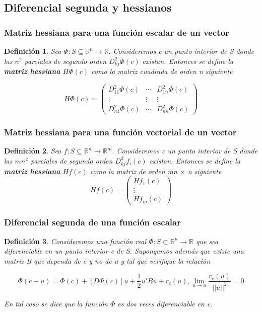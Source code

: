 \documentclass{article}
\theoremstyle{theorem-style}  %
\theoremstyle{definition-style}
\newtheorem{definition}{Definición}[section]
\theoremstyle{example-style}
\theoremstyle{exercise-style}
\begin{document}
	\subsection{Diferencial segunda y hessianos}
	
	\subsubsection{Matriz hessiana para una función escalar de un vector}
	
	\begin{definition}
		Sea $\Phi: S \subseteq \mathbb{R}^n \rightarrow \mathbb{R}.$ Consideremos c un punto interior de S donde las $n^2$ parciales de segundo orden $D^2_{kj}\Phi(c)$ existan. Entonces se define la \textbf{matriz hessiana} $H\Phi(c)$ como la matriz cuadrada de orden n siguiente
		
		$$H\Phi(c) = \left( \begin{matrix}
		D^2_{11}\Phi(c) & \cdots & D^2_{1n}\Phi(c)\\
		\vdots & \vdots & \vdots \\
		D^2_{n1}\Phi(c) & \cdots & D^2_{nn}\Phi(c) \end{matrix} \right)$$
	\end{definition}
	
	\subsubsection{Matriz hessiana para una función vectorial de un vector}
	
	\begin{definition}
		Sea $f: S \subseteq \mathbb{R}^n \rightarrow \mathbb{R}^m.$ Consideremos c un punto interior de S donde las $mn^2$ parciales de segundo orden $D^2_{kj}f_i(c)$ existan. Entonces se define la \textbf{matriz hessiana} $Hf(c)$ como la matriz de orden mn $\times$ n siguiente
		$$Hf(c) = \left( \begin{matrix}
		Hf_1(c) \\
		\vdots \\
		Hf_m(c) \end{matrix} \right)$$
	\end{definition}
	
	\subsubsection{Diferencial segunda de una función escalar}
	
	\begin{definition}
		Consideremos una función real $\Phi: S \subset \mathbb{R}^n \rightarrow \mathbb{R}$ que sea diferenciable en un punto interior c de S. Supongamos además que existe una matriz B que dependa de c y no de u y tal que verifique la relación
		
		$$\Phi(c + u) = \Phi(c) + [D \Phi(c)]u + \frac{1}{2} u' Bu + r_c(u), \lim_{u \rightarrow u} \frac{r_c(u)}{||u||^2} = 0$$
		
		En tal caso se dice que la función $\Phi$ es dos veces diferenciable en c.
	\end{definition}
	
\end{document}
